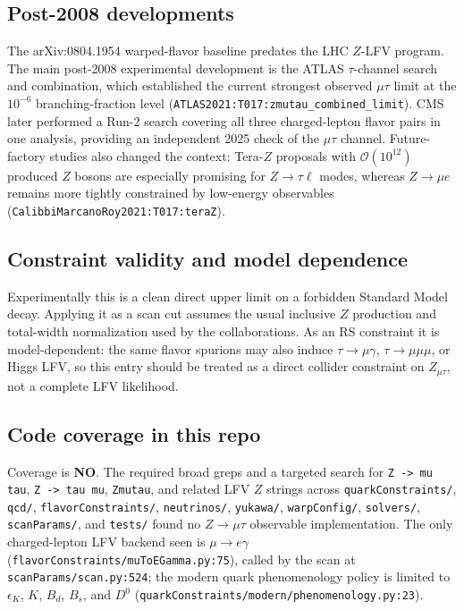 \subsection*{Post-2008 developments}
The arXiv:0804.1954 warped-flavor baseline predates the LHC \(Z\)-LFV
program.  The main post-2008 experimental development is the ATLAS
\(\tau\)-channel search and combination, which established the current
strongest observed \(\mu\tau\) limit at the \(10^{-6}\) branching-fraction
level (\texttt{ATLAS2021:T017:zmutau\_combined\_limit}).  CMS later performed
a Run-2 search covering all three charged-lepton flavor pairs in one analysis,
providing an independent 2025 check of the \(\mu\tau\) channel.  Future-factory
studies also changed the context:
Tera-\(Z\) proposals with \(\mathcal{O}(10^{12})\) produced \(Z\) bosons are
especially promising for \(Z\to\tau\ell\) modes, whereas \(Z\to\mu e\) remains
more tightly constrained by low-energy observables
(\texttt{CalibbiMarcanoRoy2021:T017:teraZ}).

\subsection*{Constraint validity and model dependence}
Experimentally this is a clean direct upper limit on a forbidden Standard
Model decay.  Applying it as a scan cut assumes the usual inclusive \(Z\)
production and total-width normalization used by the collaborations.  As an
RS constraint it is model-dependent: the same flavor spurions may also induce
\(\tau\to\mu\gamma\), \(\tau\to\mu\mu\mu\), or Higgs LFV, so this entry should
be treated as a direct collider constraint on \(Z_{\mu\tau}\), not a complete
LFV likelihood.

\subsection*{Code coverage in this repo}
Coverage is \textbf{NO}.  The required broad greps and a targeted search for
\texttt{Z -> mu tau}, \texttt{Z -> tau mu}, \texttt{Zmutau}, and related LFV
\(Z\) strings across \texttt{quarkConstraints/}, \texttt{qcd/},
\texttt{flavorConstraints/}, \texttt{neutrinos/}, \texttt{yukawa/},
\texttt{warpConfig/}, \texttt{solvers/}, \texttt{scanParams/}, and
\texttt{tests/} found no \(Z\to\mu\tau\) observable implementation.  The only
charged-lepton LFV backend seen is \(\mu\to e\gamma\)
(\texttt{flavorConstraints/muToEGamma.py:75}), called by the scan at
\texttt{scanParams/scan.py:524}; the modern quark phenomenology policy is
limited to \(\epsilon_K\), \(K\), \(B_d\), \(B_s\), and \(D^0\)
(\texttt{quarkConstraints/modern/phenomenology.py:23}).

